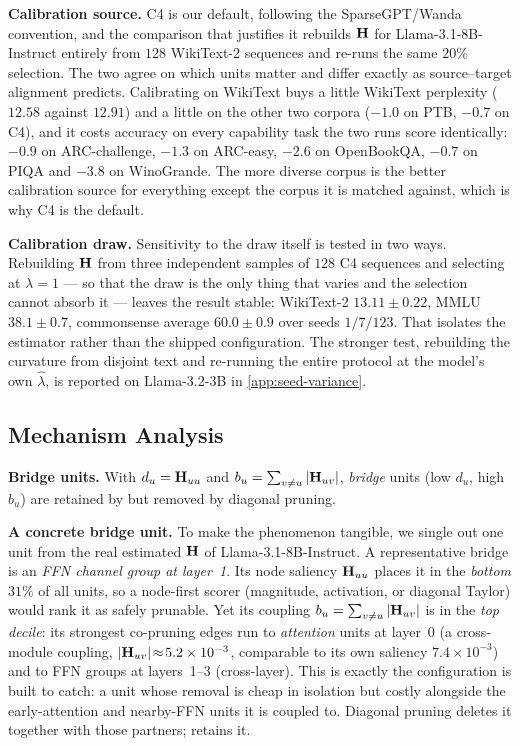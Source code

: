 \textbf{Calibration source.} C4 is our default, following the SparseGPT/Wanda convention, and the
comparison that justifies it rebuilds $\mathbf{H}$ for Llama-3.1-8B-Instruct entirely from $128$
WikiText-2 sequences and re-runs the same $20\%$ selection. The two agree on which units matter and
differ exactly as source--target alignment predicts. Calibrating on WikiText buys a little WikiText
perplexity ($12.58$ against $12.91$) and a little on the other two corpora ($-1.0$ on PTB, $-0.7$ on
C4), and it costs accuracy on every capability task the two runs score identically: $-0.9$ on
ARC-challenge, $-1.3$ on ARC-easy, $-2.6$ on OpenBookQA, $-0.7$ on PIQA and $-3.8$ on WinoGrande.
The more diverse corpus is the better calibration source for everything except the corpus it is
matched against, which is why C4 is the default.

\textbf{Calibration draw.} Sensitivity to the draw itself is tested in two ways. Rebuilding $\mathbf{H}$
from three independent samples of $128$ C4 sequences and selecting at $\lambda{=}1$ --- so that the draw
is the only thing that varies and the selection cannot absorb it --- leaves the result stable: WikiText-2
$13.11{\pm}0.22$, MMLU $38.1{\pm}0.7$, commonsense average $60.0{\pm}0.9$ over seeds $1/7/123$. That
isolates the estimator rather than the shipped configuration. The stronger test, rebuilding the curvature
from disjoint text and re-running the entire protocol at the model's own $\hat\lambda$, is reported on
Llama-3.2-3B in \cref{app:seed-variance}.

\subsection{Mechanism Analysis}

\label{app:mechanism}
\textbf{Bridge units.} With $d_u=\mathbf{H}_{uu}$ and $b_u=\sum_{v\ne u}|\mathbf{H}_{uv}|$,
\emph{bridge} units (low $d_u$, high $b_u$) are retained by \method but removed by diagonal pruning.

\textbf{A concrete bridge unit.} To make the phenomenon tangible, we single out one unit from the real
estimated $\mathbf{H}$ of Llama-3.1-8B-Instruct. A representative bridge is an \emph{FFN channel group at
layer~1}. Its node saliency $\mathbf{H}_{uu}$ places it in the \emph{bottom $31\%$} of all units, so a
node-first scorer (magnitude, activation, or diagonal Taylor) would rank it as safely prunable. Yet its coupling $b_u=\sum_{v\ne u}|\mathbf{H}_{uv}|$ is in the \emph{top decile}: its strongest co-pruning edges run
to \emph{attention} units at layer~0 (a cross-module coupling, $|\mathbf{H}_{uv}|\!\approx\!5.2\times10^{-3}$,
comparable to its own saliency $7.4\times10^{-3}$) and to FFN groups at layers~1--3 (cross-layer). This is
exactly the configuration \method is built to catch: a unit whose removal is cheap in isolation but
costly alongside the early-attention and nearby-FFN units it is coupled to. Diagonal pruning deletes it
together with those partners; \method retains it.

